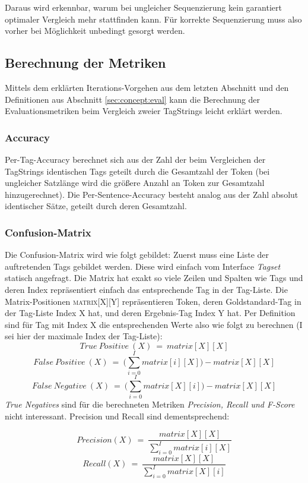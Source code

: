 Daraus wird erkennbar, warum bei ungleicher Sequenzierung kein garantiert optimaler Vergleich mehr stattfinden kann. Für korrekte Sequenzierung muss also vorher bei Möglichkeit unbedingt gesorgt werden.

\subsection{Berechnung der Metriken}
\label{sec:impl:eval:calc}

Mittels dem erklärten Iterations-Vorgehen aus dem letzten Abschnitt und den Definitionen aus Abschnitt \ref{sec:concept:eval} kann die Berechnung der Evaluationsmetriken beim Vergleich zweier TagStrings leicht erklärt werden.

\subsubsection{Accuracy}
Per-Tag-Accuracy berechnet sich aus der Zahl der beim Vergleichen der TagStrings identischen Tags geteilt durch die Gesamtzahl der Token (bei ungleicher Satzlänge wird die größere Anzahl an Token zur Gesamtzahl hinzugerechnet). Die Per-Sentence-Accuracy besteht analog aus der Zahl absolut identischer Sätze, geteilt durch deren Gesamtzahl.

\subsubsection{Confusion-Matrix}
Die Confusion-Matrix wird wie folgt gebildet: Zuerst muss eine Liste der auftretenden Tags gebildet werden. Diese wird einfach vom Interface \textit{Tagset} statisch angefragt. Die Matrix hat exakt so viele Zeilen und Spalten wie Tags und deren Index repräsentiert einfach das entsprechende Tag in der Tag-Liste. Die Matrix-Positionen \textsc{matrix[X][Y]} repräsentieren Token, deren Goldstandard-Tag in der Tag-Liste Index X hat, und deren Ergebnis-Tag Index Y hat. Per Definition sind für Tag mit Index X die entsprechenden Werte also wie folgt zu berechnen (\textsc{I} sei hier der maximale Index der Tag-Liste):
\[True\: Positive\:(X)\:=\: matrix[X][X]\]
\[False\: Positive\:(X)\:=\: \Bigg(\sum_{i=0}^I matrix[i][X]\Bigg) - matrix[X][X] \]
\[False\: Negative\:(X)\:=\: \Bigg(\sum_{i=0}^I matrix[X][i]\Bigg) - matrix[X][X] \]
\textit{True Negatives} sind für die berechneten Metriken \textit{Precision, Recall und F-Score} nicht interessant. Precision und Recall sind dementsprechend:

\[Precision(X) \:=\: \frac{matrix[X][X]}{\sum_{i=0}^I matrix[i][X]}\]
\[Recall(X) \:=\: \frac{matrix[X][X]}{\sum_{i=0}^I matrix[X][i]}\]
 
